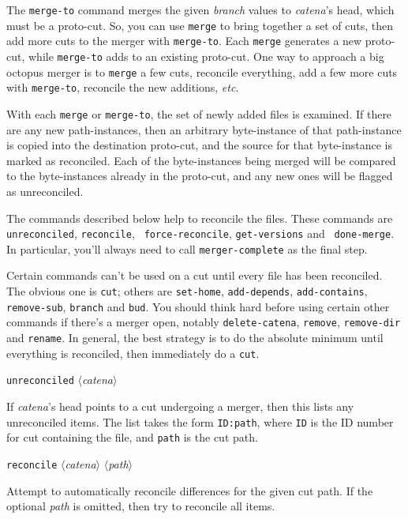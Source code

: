 \documentclass[10pt]{article}
\newcommand{\itarg}[1]{\textit{$\langle$#1$\rangle$}}
\begin{document}
{\begin{hang}
The {\tt merge-to} command merges the given {\it branch} values to
{\it catena}'s head, which must be a proto-cut. So, you can use 
{\tt merge} to bring together a set of cuts, then add more cuts to the merger
with {\tt merge-to}. Each {\tt merge} generates a new proto-cut, while
{\tt merge-to} adds to an existing proto-cut. One way to approach a
big octopus merger is to {\tt merge} a few cuts, reconcile everything,
add a few more cuts with {\tt merge-to}, reconcile the new
additions, {\it etc}. 

With each {\tt merge} or {\tt merge-to}, the set of newly added files
is examined. If there are any new path-instances, then an arbitrary
byte-instance of that path-instance is copied into the destination
proto-cut, and the source for that byte-instance is marked as
reconciled. Each of the byte-instances being merged will be compared
to the byte-instances already in the proto-cut, and any new ones will
be flagged as unreconciled.

The commands described below help to reconcile the files. These
commands are {\tt unreconciled}, {\tt reconcile}, {\tt 
  force-reconcile}, {\tt get-versions} and {\tt
  done-merge}. In particular,
you'll always need to call {\tt merger-complete} as the final step.

Certain commands can't be used on a cut until every file has been
reconciled. The obvious one is {\tt cut}; others are {\tt set-home},
{\tt add-depends}, {\tt add-contains}, {\tt remove-sub}, {\tt branch}
and {\tt bud}. You should think hard before using certain other commands if
there's a merger open, notably {\tt delete-catena}, {\tt remove}, 
{\tt remove-dir} and {\tt rename}. In general, the best strategy is to
do the absolute minimum until everything is reconciled, then
immediately do a {\tt cut}.
\end{hang}  

{\tt unreconciled} \itarg{catena}
\begin{hang}
If {\it catena}'s head points to a cut undergoing a merger, then this lists
any unreconciled items. The list takes the form {\tt ID:path}, where
{\tt ID} is the ID number for cut containing the file, and {\tt path}
is the cut path.
\end{hang}

{\tt reconcile} \itarg{catena} \itarg{path}
\begin{hang}
Attempt to automatically reconcile differences for the given cut path.
If the optional {\it path} is omitted, then try to reconcile all
items.
\end{hang}
  
}
\end{document}
